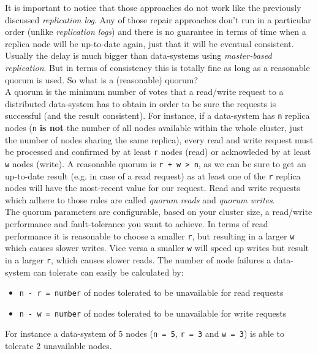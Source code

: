 {It is important to notice that those approaches do not work like the previously discussed \textit{replication log}. Any of those repair approaches don't run in a particular order (unlike \textit{replication logs}) and there is no guarantee in terms of time when a replica node will be up-to-date again, just that it will be eventual consistent. Usually the delay is much bigger than data-systems using \textit{master-based replication}. But in terms of consistency this is totally fine as long as a reasonable quorum is used. So what is a (reasonable) quorum?\\
A quorum is the minimum number of votes that a read/write request to a distributed data-system has to obtain in order to be sure the requests is successful (and the result consistent). For instance, if a data-system has \lstinline{n} replica nodes (\lstinline{n} \textbf{is not} the number of all nodes available within the whole cluster, just the number of nodes sharing the same replica), every read and write request must be processed and confirmed by at least \lstinline{r} nodes (read) or acknowleded by at least \lstinline{w} nodes (write). A reasonable quorum is \lstinline{r + w > n}, as we can be sure to get an up-to-date result (e.g. in case of a read request) as at least one of the \lstinline{r} replica nodes will have the most-recent value for our request. Read and write requests which adhere to those rules are called \textit{quorum reads} and \textit{quorum writes}.\\
The quorum parameters are configurable, based on your cluster size, a read/write performance and fault-tolerance you want to achieve. In terms of read performance it is reasonable to choose a smaller \lstinline{r}, but resulting in a larger \lstinline{w} which causes slower writes. Vice versa a smaller \lstinline{w} will speed up writes but result in a larger \lstinline{r}, which causes slower reads. The number of node failures a data-system can tolerate can easily be calculated by:
\begin{itemize}
\item \lstinline{n - r = number} of nodes tolerated to be unavailable for read requests
\item \lstinline{n - w = number} of nodes tolerated to be unavailable for write requests \\
\end{itemize}

For instance a data-system of 5 nodes (\lstinline{n = 5}, \lstinline{r = 3} and \lstinline{w = 3}) is able to tolerate 2 unavailable nodes. 

}
